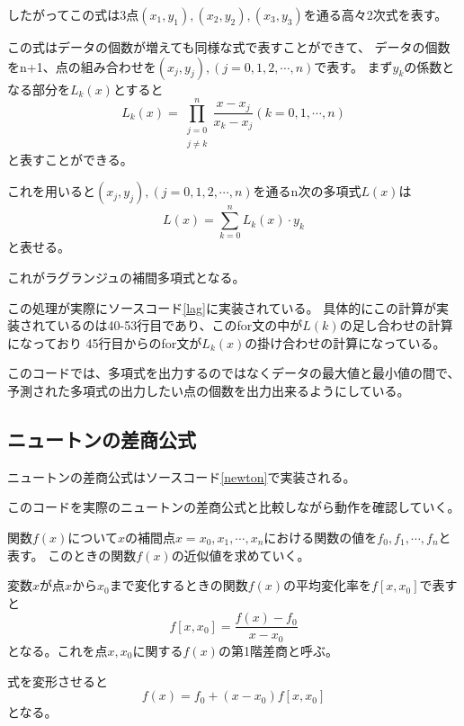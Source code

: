 \documentclass[a4paper,11pt,dvipdfmx]{jsarticle}
\begin{document}
したがってこの式は3点$(x_1,y_1),(x_2,y_2),(x_3,y_3)$を通る高々2次式を表す。

この式はデータの個数が増えても同様な式で表すことができて、
データの個数をn+1、点の組み合わせを$(x_j,y_j),(j=0,1,2,\cdots,n)$で表す。
まず$y_k$の係数となる部分を$L_k(x)$とすると
\begin{equation*}
    L_k(x) = \prod_{\substack{j=0 \\ j \neq k}}^{n} \frac{x-x_j}{x_k-x_j} (k=0,1,\cdots,n)
\end{equation*}
と表すことができる。

これを用いると$(x_j,y_j),(j=0,1,2,\cdots,n)$を通るn次の多項式$L(x)$は
\begin{equation*}
    L(x) = \sum_{k=0}^{n} L_k(x) \cdot y_k
\end{equation*}
と表せる。

これがラグランジュの補間多項式となる。

この処理が実際にソースコード\ref{lag}に実装されている。
具体的にこの計算が実装されているのは40-53行目であり、このfor文の中が$L(k)$の足し合わせの計算になっており
45行目からのfor文が$L_k(x)$の掛け合わせの計算になっている。

このコードでは、多項式を出力するのではなくデータの最大値と最小値の間で、
予測された多項式の出力したい点の個数を出力出来るようにしている。

\subsection{ニュートンの差商公式}
ニュートンの差商公式はソースコード\ref{newton}で実装される。


このコードを実際のニュートンの差商公式と比較しながら動作を確認していく。

関数$f(x)$について$x$の補間点$x=x_0,x_1,\cdots,x_n$における関数の値を$f_0,f_1,\cdots,f_n$と表す。
このときの関数$f(x)$の近似値を求めていく。

変数$x$が点$x$から$x_0$まで変化するときの関数$f(x)$の平均変化率を$f[x,x_0]$で表すと
\begin{equation*}
    f[x,x_0] = \frac{f(x) - f_0}{x - x_0}
\end{equation*}
となる。これを点$x,x_0$に関する$f(x)$の第1階差商と呼ぶ。

式を変形させると
\begin{equation*}
    f(x) = f_0 +(x-x_0)f[x,x_0]
\end{equation*}
となる。
\end{document}
